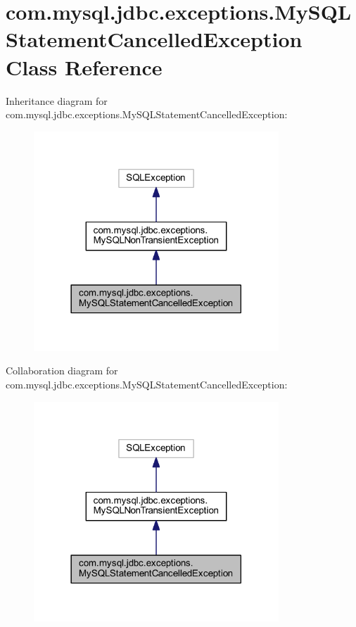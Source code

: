 \hypertarget{classcom_1_1mysql_1_1jdbc_1_1exceptions_1_1_my_s_q_l_statement_cancelled_exception}{}\section{com.\+mysql.\+jdbc.\+exceptions.\+My\+S\+Q\+L\+Statement\+Cancelled\+Exception Class Reference}
\label{classcom_1_1mysql_1_1jdbc_1_1exceptions_1_1_my_s_q_l_statement_cancelled_exception}


Inheritance diagram for com.\+mysql.\+jdbc.\+exceptions.\+My\+S\+Q\+L\+Statement\+Cancelled\+Exception\+:
\nopagebreak
\begin{figure}[H]
\begin{center}
\leavevmode
\includegraphics[width=261pt]{classcom_1_1mysql_1_1jdbc_1_1exceptions_1_1_my_s_q_l_statement_cancelled_exception__inherit__graph}
\end{center}
\end{figure}


Collaboration diagram for com.\+mysql.\+jdbc.\+exceptions.\+My\+S\+Q\+L\+Statement\+Cancelled\+Exception\+:
\nopagebreak
\begin{figure}[H]
\begin{center}
\leavevmode
\includegraphics[width=261pt]{classcom_1_1mysql_1_1jdbc_1_1exceptions_1_1_my_s_q_l_statement_cancelled_exception__coll__graph}
\end{center}
\end{figure}
